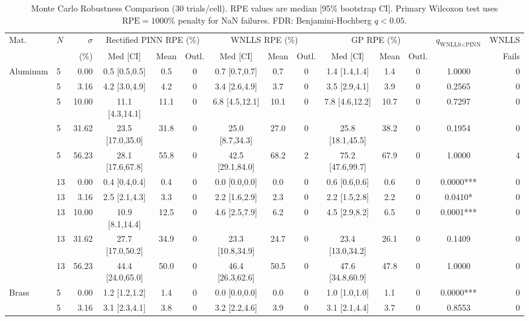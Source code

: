 \begin{table}[htbp]
\centering
\caption{Monte Carlo Robustness Comparison (30 trials/cell). RPE values are median [95\% bootstrap CI]. Primary Wilcoxon test uses $\text{RPE}=1000\%$ penalty for NaN failures. FDR: Benjamini-Hochberg $q < 0.05$.}
\label{tab:main_robustness}
\scriptsize
\begin{tabular}{llr|ccc|ccc|ccc|cr}
\toprule
Mat. & $N$ & $\sigma$ & \multicolumn{3}{c|}{Rectified PINN RPE (\%)} & \multicolumn{3}{c|}{WNLLS RPE (\%)} & \multicolumn{3}{c|}{GP RPE (\%)} & $q_{\text{WNLLS<PINN}}$ & WNLLS\\
 & & (\%) & Med [CI] & Mean & Outl. & Med [CI] & Mean & Outl. & Med [CI] & Mean & Outl. & & Fails\\
\midrule
\midrule Aluminum & 5 & 0.00 & 0.5 [0.5,0.5] & 0.5 & 0 & 0.7 [0.7,0.7] & 0.7 & 0 & 1.4 [1.4,1.4] & 1.4 & 0 & 1.0000 & 0\\
 & 5 & 3.16 & 4.2 [3.0,4.9] & 4.2 & 0 & 3.4 [2.6,4.9] & 3.7 & 0 & 3.5 [2.9,4.1] & 3.9 & 0 & 0.2565 & 0\\
 & 5 & 10.00 & 11.1 [4.3,14.1] & 11.1 & 0 & 6.8 [4.5,12.1] & 10.1 & 0 & 7.8 [4.6,12.2] & 10.7 & 0 & 0.7297 & 0\\
 & 5 & 31.62 & 23.5 [17.0,35.0] & 31.8 & 0 & 25.0 [8.7,34.3] & 27.0 & 0 & 25.8 [18.1,45.5] & 38.2 & 0 & 0.1954 & 0\\
 & 5 & 56.23 & 28.1 [17.6,67.8] & 55.8 & 0 & 42.5 [29.1,84.0] & 68.2 & 2 & 75.2 [47.6,99.7] & 67.9 & 0 & 1.0000 & 4\\
 & 13 & 0.00 & 0.4 [0.4,0.4] & 0.4 & 0 & 0.0 [0.0,0.0] & 0.0 & 0 & 0.6 [0.6,0.6] & 0.6 & 0 & 0.0000*** & 0\\
 & 13 & 3.16 & 2.5 [2.1,4.3] & 3.3 & 0 & 2.2 [1.6,2.9] & 2.3 & 0 & 2.2 [1.5,2.8] & 2.2 & 0 & 0.0410* & 0\\
 & 13 & 10.00 & 10.9 [8.1,14.4] & 12.5 & 0 & 4.6 [2.5,7.9] & 6.2 & 0 & 4.5 [2.9,8.2] & 6.5 & 0 & 0.0001*** & 0\\
 & 13 & 31.62 & 27.7 [17.0,50.2] & 34.9 & 0 & 23.3 [10.8,34.9] & 24.7 & 0 & 23.4 [13.0,34.2] & 26.1 & 0 & 0.1409 & 0\\
 & 13 & 56.23 & 44.4 [24.0,65.0] & 50.0 & 0 & 46.4 [26.3,62.6] & 50.5 & 0 & 47.6 [34.8,60.9] & 47.8 & 0 & 1.0000 & 0\\
\midrule Brass & 5 & 0.00 & 1.2 [1.2,1.2] & 1.4 & 0 & 0.0 [0.0,0.0] & 0.0 & 0 & 1.0 [1.0,1.0] & 1.1 & 0 & 0.0000*** & 0\\
 & 5 & 3.16 & 3.1 [2.3,4.1] & 3.8 & 0 & 3.2 [2.2,4.6] & 3.9 & 0 & 3.1 [2.1,4.4] & 3.7 & 0 & 0.8553 & 0\\

\end{tabular}
\end{table}
